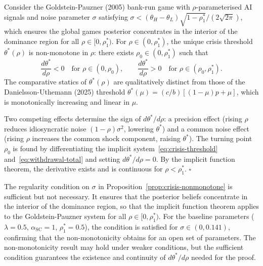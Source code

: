 \begin{proposition}\label{prop:crisis-nonmonotone}
  Consider the Goldstein-Pauzner (2005) bank-run game with $\rho$-parameterised AI signals and noise parameter $\sigma$ satisfying $\sigma < (\theta_H - \theta_L)\sqrt{1-\rho_1^*}/(2\sqrt{2\pi})$, which ensures the global games posterior concentrates in the interior of the dominance region for all $\rho \in [0, \rho_1^*)$. For $\rho \in (0, \rho_1^*)$, the unique crisis threshold $\theta^*(\rho)$ is non-monotone in $\rho$: there exists $\rho_0 \in (0, \rho_1^*)$ such that
  \begin{equation}\label{eq:theta-star-monotonicity}
    \frac{d\theta^*}{d\rho} < 0 \quad \text{for } \rho \in (0, \rho_0), \qquad
    \frac{d\theta^*}{d\rho} > 0 \quad \text{for } \rho \in (\rho_0, \rho_1^*).
  \end{equation}
  The comparative statics of $\theta^*(\rho)$ are qualitatively distinct from those of the Danielsson-Uthemann (2025) threshold $\theta^*(\mu) = (c/b)[(1-\mu)p + \mu]$, which is monotonically increasing and linear in $\mu$.

   Two competing effects determine the sign of $d\theta^*/d\rho$: a precision effect (rising $\rho$ reduces idiosyncratic noise $(1-\rho)\sigma^2$, lowering $\theta^*$) and a common noise effect (rising $\rho$ increases the common shock component, raising $\theta^*$). The turning point $\rho_0$ is found by differentiating the implicit system~\eqref{eq:crisis-threshold} and~\eqref{eq:withdrawal-total} and setting $d\theta^*/d\rho = 0$. By the implicit function theorem, the derivative exists and is continuous for $\rho < \rho_1^*$. $\square$
\end{proposition}

The regularity condition on $\sigma$ in Proposition~\ref{prop:crisis-nonmonotone} is sufficient but not necessary. It ensures that the posterior beliefs concentrate in the interior of the dominance region, so that the implicit function theorem applies to the Goldstein-Pauzner system for all $\rho \in [0, \rho_1^*)$. For the baseline parameters ($\lambda = 0.5$, $\alpha_{\text{SC}} = 1$, $\rho_1^* = 0.5$), the condition is satisfied for $\sigma \in (0, 0.141)$, confirming that the non-monotonicity obtains for an open set of parameters. The non-monotonicity result may hold under weaker conditions, but the sufficient condition guarantees the existence and continuity of $d\theta^*/d\rho$ needed for the proof.


